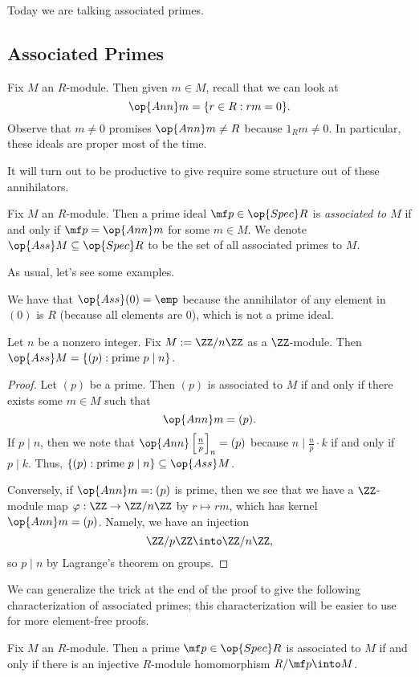 
Today we are talking associated primes.

\subsection{Associated Primes}
Fix $M$ an $R$-module. Then given $m\in M$, recall that we can look at
\[\op{Ann}m=\{r\in R:rm=0\}.\]
Observe that $m\ne0$ promises $\op{Ann}m\ne R$ because $1_Rm\ne0$. In particular, these ideals are proper most of the time.

It will turn out to be productive to give require some structure out of these annihilators.
\begin{definition}
	Fix $M$ an $R$-module. Then a prime ideal $\mf p\in\op{Spec}R$ is \textit{associated to $M$} if and only if $\mf p=\op{Ann}m$ for some $m\in M$. We denote $\op{Ass}M\subseteq\op{Spec}R$ to be the set of all associated primes to $M$.
\end{definition}
As usual, let's see some examples.
\begin{example}
	We have that $\op{Ass}(0)=\emp$ because the annihilator of any element in $(0)$ is $R$ (because all elements are $0$), which is not a prime ideal.
\end{example}
\begin{exe}
	Let $n$ be a nonzero integer. Fix $M:=\ZZ/n\ZZ$ as a $\ZZ$-module. Then $\op{Ass}M=\{(p):\text{prime }p\mid n\}$.
\end{exe}
\begin{proof}
	Let $(p)$ be a prime. Then $(p)$ is associated to $M$ if and only if there exists some $m\in M$ such that
	\[\op{Ann}m=(p).\]
	If $p\mid n$, then we note that $\op{Ann}\left[\frac np\right]_n=(p)$ because $n\mid\frac np\cdot k$ if and only if $p\mid k$. Thus, $\{(p):\text{prime }p\mid n\}\subseteq\op{Ass}M$.
	
	Conversely, if $\op{Ann}m=:(p)$ is prime, then we see that we have a $\ZZ$-module map $\varphi:\ZZ\to\ZZ/n\ZZ$ by $r\mapsto rm$, which has kernel $\op{Ann}m=(p)$. Namely, we have an injection
	\[\ZZ/p\ZZ\into\ZZ/n\ZZ,\]
	so $p\mid n$ by Lagrange's theorem on groups.
\end{proof}
We can generalize the trick at the end of the proof to give the following characterization of associated primes; this characterization will be easier to use for more element-free proofs.
\begin{lemma} \label{lem:betterassociated}
	Fix $M$ an $R$-module. Then a prime $\mf p\in\op{Spec}R$ is associated to $M$ if and only if there is an injective $R$-module homomorphism $R/\mf p\into M$.
\end{lemma}
